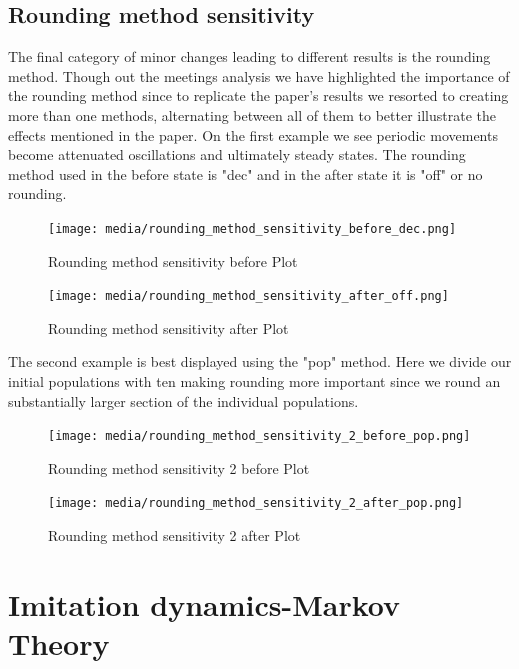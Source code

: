 \documentclass[12pt]{article}
\begin{document}
\subsection{Rounding method sensitivity}
The final category of minor changes leading to different results is the rounding method. Though out the meetings analysis we have highlighted the importance of the rounding method since to replicate the paper's results we resorted to creating more than one methods, alternating between all of them to better illustrate the effects mentioned in the paper. On the first example we see periodic movements become attenuated oscillations and ultimately steady states. The rounding method used in the before state is "dec" and in the after state it is "off" or no rounding.
\begin{figure}[H]
    \centering
    \texttt{[image: media/rounding\_method\_sensitivity\_before\_dec.png]}
    \caption{Rounding method sensitivity before Plot}
\end{figure}
\begin{figure}[H]
    \centering
    \texttt{[image: media/rounding\_method\_sensitivity\_after\_off.png]}
    \caption{Rounding method sensitivity after Plot}
\end{figure}
The second example is best displayed using the "pop" method. Here we divide our initial populations with ten making rounding more important since we round an substantially larger section of the individual populations.
\begin{figure}[H]
    \centering
    \texttt{[image: media/rounding\_method\_sensitivity\_2\_before\_pop.png]}
    \caption{Rounding method sensitivity 2 before Plot}
\end{figure}
\begin{figure}[H]
    \centering
    \texttt{[image: media/rounding\_method\_sensitivity\_2\_after\_pop.png]}
    \caption{Rounding method sensitivity 2 after Plot}
\end{figure}
\setcounter{figure}{0}
\section{Imitation dynamics-Markov Theory}
\end{document}
